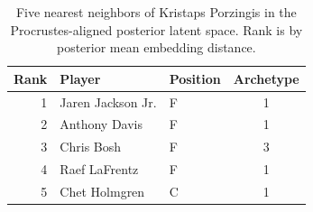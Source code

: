 \begin{table}[htbp]
  \centering\small
  \begin{tabular}{rllc}
    \toprule
    Rank & Player & Position & Archetype \\
    \midrule
    1 & Jaren Jackson Jr. & F & 1 \\
    2 & Anthony Davis & F & 1 \\
    3 & Chris Bosh & F & 3 \\
    4 & Raef LaFrentz & F & 1 \\
    5 & Chet Holmgren & C & 1 \\
    \bottomrule
  \end{tabular}
  \caption{Five nearest neighbors of Kristaps Porzingis in the Procrustes-aligned posterior latent space. Rank is by posterior mean embedding distance.}
  \label{tab:Kristaps_Porzingis_neighbors}
\end{table}

